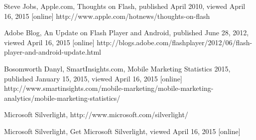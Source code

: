 \begin{thebibliography}{99}
\bibitem{}
Steve Jobs, Apple.com, Thoughts on Flash, published April 2010, viewed April 16, 2015 [online]
http://www.apple.com/hotnews/thoughts-on-flash

\bibitem{}
Adobe Blog, An Update on Flash Player and Android, published June 28, 2012, viewed April 16, 2015 [online]
http://blogs.adobe.com/flashplayer/2012/06/flash-player-and-android-update.html

\bibitem{}
Bosomworth Danyl, SmartInsights.com, Mobile Marketing Statistics 2015, published January 15, 2015, viewed April 16, 2015 [online]
http://www.smartinsights.com/mobile-marketing/mobile-marketing-analytics/mobile-marketing-statistics/

\bibitem{}
Microsoft Silverlight, http://www.microsoft.com/silverlight/

\bibitem{}
Microsoft Silverlight, Get Microsoft Silverlight, viewed April 16, 2015 [online]

\end{thebibliography}
